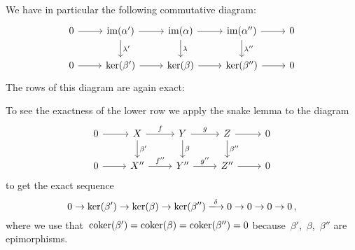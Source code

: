 We have in particular the following commutative diagram:
\begin{equation}
  \label{where to apply 5 lemma}
  \begin{tikzcd}
      0
      \arrow{r}
    & \im(\alpha')
      \arrow{r}
      \arrow{d}[right]{\lambda'}
    & \im(\alpha)
      \arrow{r}
      \arrow{d}[right]{\lambda}
    & \im(\alpha'')
      \arrow{r}
      \arrow{d}[right]{\lambda''}
    & 0
    \\
      0
      \arrow{r}
    & \ker(\beta')
      \arrow{r}
    & \ker(\beta)
      \arrow{r}
    & \ker(\beta'')
      \arrow{r}
    & 0
  \end{tikzcd}
\end{equation}
The rows of this diagram are again exact:

To see the exactness of the lower row we apply the snake lemma to the diagram
\[
  \begin{tikzcd}
      0
      \arrow{r}
    & X
      \arrow{r}[above]{f}
      \arrow{d}[right]{\beta'}
    & Y
      \arrow{r}[above]{g}
      \arrow{d}[right]{\beta}
    & Z
      \arrow{r}
      \arrow{d}[right]{\beta''}
    & 0
    \\
      0
      \arrow{r}
    & X''
      \arrow{r}[above]{f''}
    & Y''
      \arrow{r}[above]{g''}
    & Z''
      \arrow{r}
    & 0
  \end{tikzcd}
\]
to get the exact sequence
\[
  0
  \to
  \ker(\beta')
  \to
  \ker(\beta)
  \to
  \ker(\beta'')
  \xlongto{\delta}
  0
  \to
  0
  \to
  0
  \to
  0 \,,
\]
where we use that~$\operatorname{coker}(\beta') = \operatorname{coker}(\beta) = \operatorname{coker}(\beta'') = 0$ because~$\beta'$,~$\beta$,~$\beta''$ are epimorphisms.

